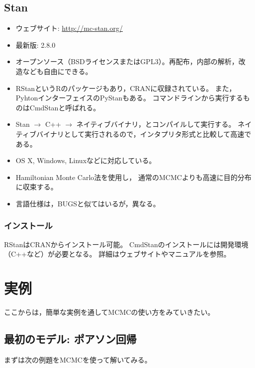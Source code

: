 \documentclass[11pt,uplatex]{jsarticle}
\begin{document}
\subsection{Stan}
\label{Stan}
\begin{itemize}

\item ウェブサイト:
  \url{http://mc-stan.org/}

\item 最新版: 2.8.0
\item オープンソース（BSDライセンスまたはGPL3）。再配布，内部の解析，改
  造なども自由にできる。
\item \textsf{RStan}という\textsf{R}のパッケージもあり，CRANに収録されている。
また，Pyhtonインターフェイスの\textsf{PyStan}もある。
コマンドラインから実行するものは\textsf{CmdStan}と呼ばれる。
\item Stan $\rightarrow$ C++ $\rightarrow$ ネイティブバイナリ，とコンパイルして実行する。
ネイティブバイナリとして実行されるので，インタプリタ形式と比較して高速である。
\item OS X, Windows, Linuxなどに対応している。
\item Hamiltonian Monte Carlo法\cite{PRML, BDA3, Toyoda2015}を使用し，
通常のMCMCよりも高速に目的分布に収束する。
\item 言語仕様は，BUGSと似てはいるが，異なる。
\end{itemize}

\subsubsection*{インストール}
RStanはCRANからインストール可能。
CmdStanのインストールには開発環境（C++など）が必要となる。
詳細はウェブサイトやマニュアルを参照。


\pagebreak

\section{実例}

ここからは，簡単な実例を通してMCMCの使い方をみていきたい。

\subsection{最初のモデル: ポアソン回帰}

まずは次の例題をMCMCを使って解いてみる。

\vspace{1zw}
\end{document}
